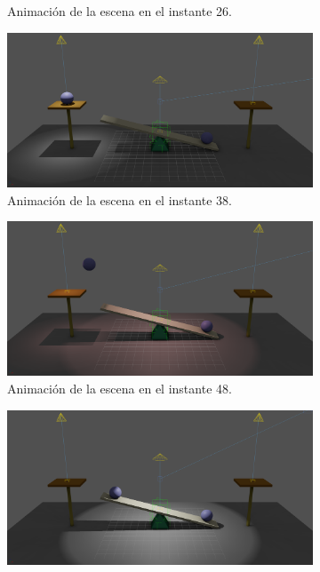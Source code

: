 \documentclass{article}
\begin{document}
\begin{figure}[H]
\begin{subfigure}[t]{0.48\textwidth}
    \caption{Animación de la escena en el instante 26.}
 \end{subfigure}
\hfill
 \begin{subfigure}[t]{0.48\textwidth}
    \centering
    \includegraphics[width=\textwidth]{imagenes/animaciones/general/38.png}
    \caption{Animación de la escena en el instante 38.}
 \end{subfigure}
\hfill
 \begin{subfigure}[t]{0.48\textwidth}
    \centering
    \includegraphics[width=\textwidth]{imagenes/animaciones/general/48.png}
    \caption{Animación de la escena en el instante 48.}
 \end{subfigure}
\hfill
 \begin{subfigure}[t]{0.48\textwidth}
    \centering
    \includegraphics[width=\textwidth]{imagenes/animaciones/general/58.png}

\end{subfigure}
\end{figure}
\end{document}

